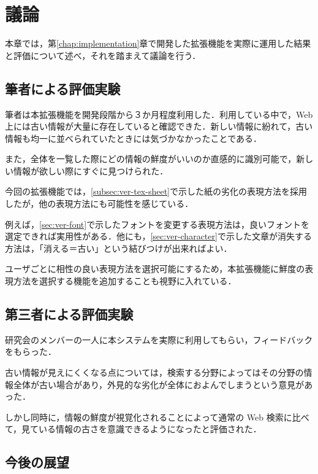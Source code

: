 \chapter{議論}
\label{chap:discussion}

本章では，第\ref{chap:implementation}章で開発した拡張機能を実際に運用した結果と評価について述べ，それを踏まえて議論を行う．

\newpage

\section{筆者による評価実験}

筆者は本拡張機能を開発段階から３か月程度利用した．利用している中で，Web 上には古い情報が大量に存在していると確認できた．新しい情報に紛れて，古い情報も均一に並べられていたときには気づかなかったことである．

また，全体を一覧した際にどの情報の鮮度がいいのか直感的に識別可能で，新しい情報が欲しい際にすぐに見つけられた．

今回の拡張機能では，\ref{subsec:ver-tex-sheet}で示した紙の劣化の表現方法を採用したが，他の表現方法にも可能性を感じている．

例えば，\ref{sec:ver-font}で示したフォントを変更する表現方法は，良いフォントを選定できれば実用性がある．他にも，\ref{sec:ver-character}で示した文章が消失する方法は，「消える＝古い」という結びつけが出来ればよい．

ユーザごとに相性の良い表現方法を選択可能にするため，本拡張機能に鮮度の表現方法を選択する機能を追加することも視野に入れている．

\section{第三者による評価実験}
\label{sec:dis_third}

研究会のメンバーの一人に本システムを実際に利用してもらい，フィードバックをもらった．

古い情報が見えにくくなる点については，検索する分野によってはその分野の情報全体が古い場合があり，外見的な劣化が全体におよんでしまうという意見があった．

しかし同時に，情報の鮮度が視覚化されることによって通常の Web 検索に比べて，見ている情報の古さを意識できるようになったと評価された．

\section{今後の展望}

